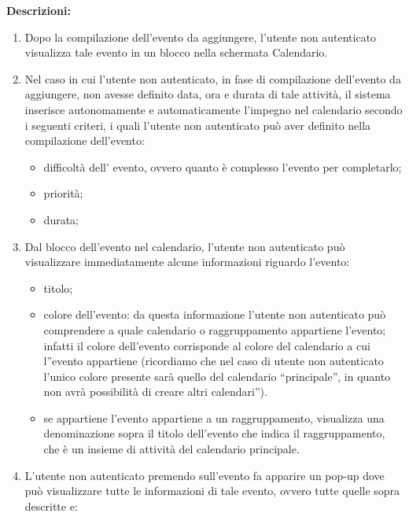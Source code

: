 \begin{listaPersonale}[UC]{}
    \textbf{Descrizioni:}
    \begin{enumerate}
        \item Dopo la compilazione dell'evento da aggiungere, l'utente non autenticato visualizza tale evento in un blocco nella schermata Calendario.
        \item Nel caso in cui l'utente non autenticato, in fase di compilazione dell'evento da aggiungere, non avesse definito data, ora e durata di tale attività, il sistema inserisce autonomamente e automaticamente l'impegno nel calendario secondo i seguenti criteri, i quali l'utente non autenticato può aver definito nella compilazione dell'evento: 
              \begin{itemize}
                  \item difficoltà dell' evento, ovvero quanto è complesso l'evento per completarlo;
                  \item priorità;
                  \item durata;
              \end{itemize}
        \item Dal blocco dell'evento nel calendario, l'utente non autenticato può visualizzare immediatamente alcune informazioni riguardo l'evento:
              \begin{itemize}
                  \item titolo;
                  \item colore dell'evento: da questa informazione l'utente non autenticato può comprendere a quale calendario o raggruppamento appartiene l'evento; infatti il colore dell'evento corrisponde al colore del calendario a cui l''evento appartiene (ricordiamo che nel caso di utente non autenticato l'unico colore presente sarà quello del calendario “principale”, in quanto non avrà possibilità di creare altri calendari”).
                  \item se appartiene l'evento appartiene a un raggruppamento, visualizza una denominazione sopra il titolo dell'evento che indica il raggruppamento, che è un insieme di attività del calendario principale. 
              \end{itemize}
        \item L'utente non autenticato premendo sull'evento fa apparire un pop-up dove può visualizzare tutte le informazioni di tale evento, ovvero tutte quelle sopra descritte e:
              \begin{itemize}

\end{itemize}
\end{enumerate}
\end{listaPersonale}
